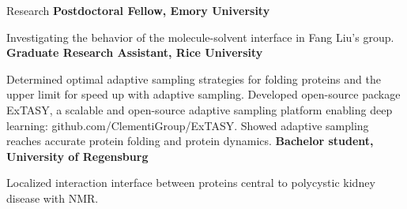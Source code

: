 \begin{rubric}{Research}
%
	\textbf{Postdoctoral Fellow, Emory University}
  \par Investigating the behavior of the molecule-solvent interface in Fang Liu's group. 
\entry*[2014 -- 2020]%
  \textbf{Graduate Research Assistant, Rice University}
  \par Determined optimal adaptive sampling strategies for folding proteins and the upper limit for speed up with adaptive sampling. Developed open-source package ExTASY, a scalable and open-source adaptive sampling platform enabling deep learning: github.com/ClementiGroup/ExTASY. Showed adaptive sampling reaches accurate protein folding and protein dynamics.
\entry*[2012]%
  \textbf{Bachelor student, University of Regensburg}
  \par Localized interaction interface between proteins central to polycystic kidney disease with NMR.
\end{rubric}

